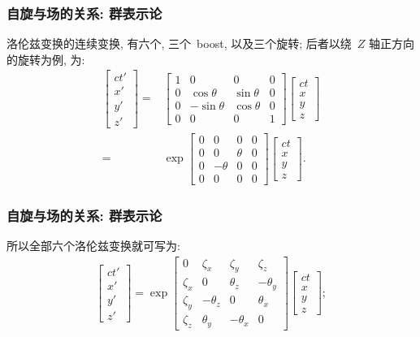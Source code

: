 \documentclass[aspectratio=169, 10pt, utf8, mathserif]{beamer}
\numberwithin{equation}{section} %
\numberwithin{figure}{section} %
\begin{document}
\begin{frame}
\frametitle{\textsc{自旋与场的关系: 群表示论}}

洛伦兹变换的连续变换, 有六个, 三个~boost, 以及三个旋转; 后者以绕~$Z$ 轴正方向的旋转为例, 为:
\begin{align}
\left[
\begin{array}{l}
ct'\\x'\\y'\\z'
\end{array}
\right]=&
\left[
\begin{array}{cccc}
1&0&0&0\\
0&\cos\theta&\sin\theta&0\\
0&-\sin\theta&\cos\theta&0\\
0&0&0&1
\end{array}
\right]
\left[
\begin{array}{l}
ct\\x\\y\\z
\end{array}
\right]\nonumber\\
=&\exp\left[
\begin{array}{cccc}
0&0&0&0\\
0&0&\theta&0\\
0&-\theta&0&0\\
0&0&0&0
\end{array}
\right]
\left[
\begin{array}{l}
ct\\x\\y\\z
\end{array}
\right].\nonumber
\end{align}
\end{frame}

\begin{frame}
\frametitle{\textsc{自旋与场的关系: 群表示论}}
所以全部六个洛伦兹变换就可写为:
\begin{align}
\left[
\begin{array}{l}
ct'\\x'\\y'\\z'
\end{array}
\right]
=\exp\left[
\begin{array}{cccc}
0&\zeta_x&\zeta_y&\zeta_z\\
\zeta_x&0&\theta_z&-\theta_y\\
\zeta_y&-\theta_z&0&\theta_x\\
\zeta_z&\theta_y&-\theta_x&0
\end{array}
\right]
\left[
\begin{array}{l}
ct\\x\\y\\z
\end{array}
\right];
\end{align}

\end{frame}
\end{document}
